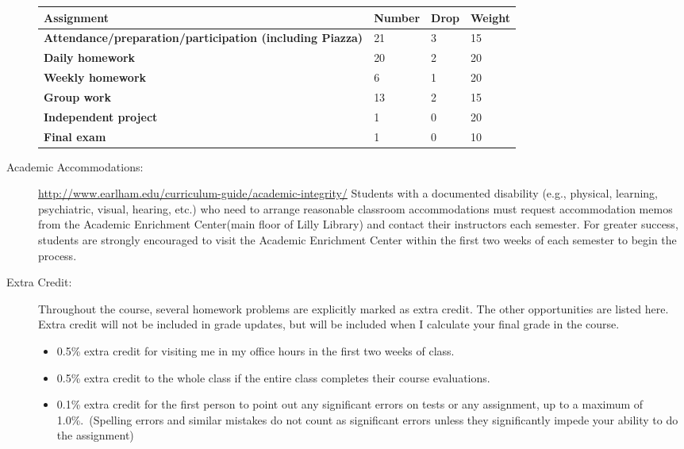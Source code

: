 \documentclass[12pt]{article}
\begin{document}
\begin{description}
\setlength{\arrayrulewidth}{1mm}
\setlength{\tabcolsep}{8pt}
{
\begin{table}[H]
\label{tab:my-table}
\begin{tabular}{llll}
\hline
\textbf{Assignment}                                              & \textbf{Number} & \textbf{Drop} & \textbf{Weight} \\ \hline
\textbf{Attendance/preparation/participation (including Piazza)} & 21     & 3    & 15     \\
\textbf{Daily homework }                                         & 20     & 2    & 20     \\
\textbf{Weekly homework }                                        & 6      & 1    & 20     \\
\textbf{Group work }                                             & 13     & 2    & 15     \\
\textbf{Independent project }                                    & 1      & 0    & 20     \\
\textbf{Final exam }                                              & 1      & 0    & 10     \\ \hline
\end{tabular}
\end{table}
}

\item[Academic Accommodations:] {\small \url{http://www.earlham.edu/curriculum-guide/academic-integrity/}}
 Students with a documented disability (e.g., physical, learning, psychiatric, visual, hearing, etc.) who need to arrange reasonable classroom accommodations must request accommodation memos from the Academic Enrichment Center(main floor of Lilly Library) and contact their instructors each semester. For greater success, students are strongly encouraged to visit the Academic Enrichment Center within the first two weeks of each semester to begin the process.
  
\item[Extra Credit:]
  Throughout the course, several homework problems are explicitly marked as extra credit. The other opportunities are listed here. Extra credit will not be included in grade updates, but will be included when I calculate your final grade in the course.
  \begin{itemize}
  \item 0.5\% extra credit for visiting me in my office hours in the first two weeks of class.
  \item 0.5\% extra credit to the whole class if the entire class completes their course evaluations.
  \item 0.1\% extra credit for the first person to point out any significant errors on tests or any assignment, up to a maximum of 1.0\%.\ (Spelling errors and similar mistakes do not count as significant errors unless they significantly impede your ability to do the assignment) 
    \end{itemize}


\end{description}
\end{document}
